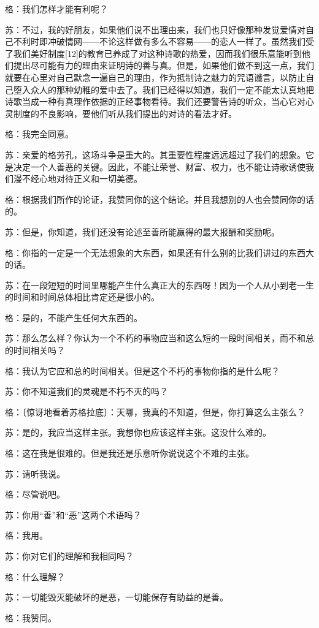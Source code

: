 \documentclass[12pt,oneside]{book}
\begin{document}
格：我们怎样才能有利呢？

苏：不过，我的好朋友，如果他们说不出理由来，我们也只好像那种发觉爱情对自己不利时即冲破情网——不论这样做有多么不容易——的恋人一样了。虽然我们受了我们美好制度[12]的教育已养成了对这种诗歌的热爱，因而我们很乐意能听到他们提出尽可能有力的理由来证明诗的善与真。但是，如果他们做不到这一点，我们就要在心里对自己默念一遍自己的理由，作为抵制诗之魅力的咒语谶言，以防止自己堕入众人的那种幼稚的爱中去了。我们已经得以知道，我们一定不能太认真地把诗歌当成一种有真理作依据的正经事物看待。我们还要警告诗的听众，当心它对心灵制度的不良影响，要他们听从我们提出的对诗的看法才好。

格：我完全同意。

苏：亲爱的格劳孔，这场斗争是重大的。其重要性程度远远超过了我们的想象。它是决定一个人善恶的关键。因此，不能让荣誉、财富、权力，也不能让诗歌诱使我们漫不经心地对待正义和一切美德。

格：根据我们所作的论证，我赞同你的这个结论。并且我想别的人也会赞同你的话的。

苏：但是，你知道，我们还没有论述至善所能赢得的最大报酬和奖励呢。

格：你指的一定是一个无法想象的大东西，如果还有什么别的比我们讲过的东西大的话。

苏：在一段短短的时间里哪能产生什么真正大的东西呀！因为一个人从小到老一生的时间和时间总体相比肯定还是很小的。

格：是的，不能产生任何大东西的。

苏：那么怎么样？你认为一个不朽的事物应当和这么短的一段时间相关，而不和总的时间相关吗？

格：我认为它应和总的时间相关。但是这个不朽的事物你指的是什么呢？

苏：你不知道我们的灵魂是不朽不灭的吗？

格：〔惊讶地看着苏格拉底〕：天哪，我真的不知道，但是，你打算这么主张么？

苏：是的，我应当这样主张。我想你也应该这样主张。这没什么难的。

格：这在我是很难的。但是我还是乐意听你说说这个不难的主张。

苏：请听我说。

格：尽管说吧。

苏：你用“善”和“恶”这两个术语吗？

格：我用。

苏：你对它们的理解和我相同吗？

格：什么理解？

苏：一切能毁灭能破坏的是恶，一切能保存有助益的是善。

格：我赞同。
\end{document}
